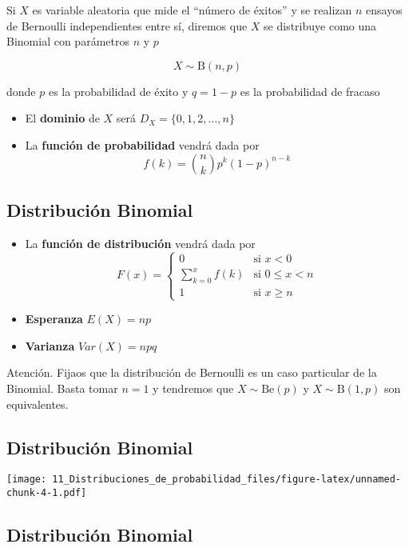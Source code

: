 \documentclass[
]{article}
\providecommand{\tightlist}{%
  \setlength{\itemsep}{0pt}\setlength{\parskip}{0pt}}
\begin{document}
Si \(X\) es variable aleatoria que mide el ``número de éxitos'' y se
realizan \(n\) ensayos de Bernoulli independientes entre sí, diremos que
\(X\) se distribuye como una Binomial con parámetros \(n\) y \(p\)

\[X\sim \text{B}(n,p)\]

donde \(p\) es la probabilidad de éxito y \(q = 1-p\) es la probabilidad
de fracaso

\begin{itemize}
\tightlist
\item
  El \textbf{dominio} de \(X\) será \(D_X = \{0,1,2,\dots,n\}\)
\item
  La \textbf{función de probabilidad} vendrá dada por
  \[f(k) = {n\choose k}p^k(1-p)^{n-k} \]
\end{itemize}

\hypertarget{distribuciuxf3n-binomial-1}{%
\subsection{Distribución Binomial}\label{distribuciuxf3n-binomial-1}}

\begin{itemize}
\tightlist
\item
  La \textbf{función de distribución} vendrá dada por \[F(x) = \left\{
  \begin{array}{cl}
     0 & \text{si } x<0 
  \\ \sum_{k=0}^xf(k) & \text{si } 0\le x<n
  \\ 1 & \text{si } x\ge n
  \end{array}
  \right.\]
\item
  \textbf{Esperanza} \(E(X) = np\)
\item
  \textbf{Varianza} \(Var(X) = npq\)
\end{itemize}

Atención. Fijaos que la distribución de Bernoulli es un caso particular
de la Binomial. Basta tomar \(n=1\) y tendremos que
\(X\sim \text{Be}(p)\) y \(X\sim\text{B}(1,p)\) son equivalentes.

\hypertarget{distribuciuxf3n-binomial-2}{%
\subsection{Distribución Binomial}\label{distribuciuxf3n-binomial-2}}

\texttt{[image: 11\_Distribuciones\_de\_probabilidad\_files/figure-latex/unnamed-chunk-4-1.pdf]}

\hypertarget{distribuciuxf3n-binomial-3}{%
\subsection{Distribución Binomial}\label{distribuciuxf3n-binomial-3}}
\end{document}
